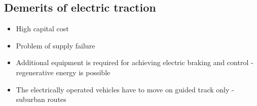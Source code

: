\subsection{Demerits of electric traction}
\begin{itemize}
    \item High capital cost
    \item Problem of supply failure
    \item Additional equipment is required for achieving electric braking and control - regenerative energy is possible
    \item The electrically operated vehicles have to move on guided track only - suburban routes
\end{itemize}